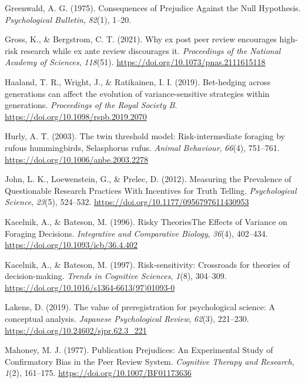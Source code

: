 \documentclass[british,,doc,mask,floatsintext]{apa6}
\begin{document}
\leavevmode\hypertarget{ref-Greenwald1975}{}%
Greenwald, A. G. (1975). Consequences of Prejudice Against the Null Hypothesis. \emph{Psychological Bulletin}, \emph{82}(1), 1--20.

\leavevmode\hypertarget{ref-Gross2021}{}%
Gross, K., \& Bergstrom, C. T. (2021). Why ex post peer review encourages high-risk research while ex ante review discourages it. \emph{Proceedings of the National Academy of Sciences}, \emph{118}(51). \url{https://doi.org/10.1073/pnas.2111615118}

\leavevmode\hypertarget{ref-Haaland2019}{}%
Haaland, T. R., Wright, J., \& Ratikainen, I. I. (2019). Bet-hedging across generations can affect the evolution of variance-sensitive strategies within generations. \emph{Proceedings of the Royal Society B}. \url{https://doi.org/10.1098/rspb.2019.2070}

\leavevmode\hypertarget{ref-Hurly2003}{}%
Hurly, A. T. (2003). The twin threshold model: Risk-intermediate foraging by rufous hummingbirds, Selasphorus rufus. \emph{Animal Behaviour}, \emph{66}(4), 751--761. \url{https://doi.org/10.1006/anbe.2003.2278}

\leavevmode\hypertarget{ref-John2012}{}%
John, L. K., Loewenstein, G., \& Prelec, D. (2012). Measuring the Prevalence of Questionable Research Practices With Incentives for Truth Telling. \emph{Psychological Science}, \emph{23}(5), 524--532. \url{https://doi.org/10.1177/0956797611430953}

\leavevmode\hypertarget{ref-Kacelnik1996}{}%
Kacelnik, A., \& Bateson, M. (1996). Risky TheoriesThe Effects of Variance on Foraging Decisions. \emph{Integrative and Comparative Biology}, \emph{36}(4), 402--434. \url{https://doi.org/10.1093/icb/36.4.402}

\leavevmode\hypertarget{ref-Kacelnik1997}{}%
Kacelnik, A., \& Bateson, M. (1997). Risk-sensitivity: Crossroads for theories of decision-making. \emph{Trends in Cognitive Sciences}, \emph{1}(8), 304--309. \url{https://doi.org/10.1016/s1364-6613(97)01093-0}

\leavevmode\hypertarget{ref-Lakens2019b}{}%
Lakens, D. (2019). The value of preregistration for psychological science: A conceptual analysis. \emph{Japanese Psychological Review}, \emph{62}(3), 221--230. \url{https://doi.org/10.24602/sjpr.62.3_221}

\leavevmode\hypertarget{ref-Mahoney1977}{}%
Mahoney, M. J. (1977). Publication Prejudices: An Experimental Study of Confirmatory Bias in the Peer Review System. \emph{Cognitive Therapy and Research}, \emph{1}(2), 161--175. \url{https://doi.org/10.1007/BF01173636}
\end{document}
